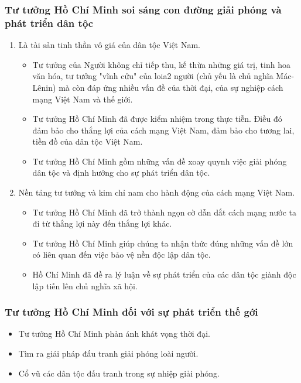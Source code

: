 \documentclass{article}
\begin{document}
	\subsubsection{Tư tưởng Hồ Chí Minh soi sáng con đường giải phóng và phát triển dân tộc}
	\begin{enumerate}
		\item Là tài sản tinh thần vô giá của dân tộc Việt Nam.
		\begin{itemize}
			\item Tư tưởng của Người không chỉ tiếp thu, kế thừa những giá trị, tinh hoa văn hóa, tư tưởng "vĩnh cửu" của loia2 người (chủ yếu là chủ nghĩa Mác-Lênin) mà còn đáp ứng nhiều vấn đề của thời đại, của sự nghiệp cách mạng Việt Nam và thế giới.
			\item Tư tưởng Hồ Chí Minh đã được kiểm nhiệm trong thực tiễn. Điều đó đảm bảo cho thắng lợi của cách mạng Việt Nam, đảm bảo cho tương lai, tiền đồ của dân tộc Việt Nam.
			\item Tư tưởng Hồ Chí Minh gồm những vấn đề xoay quynh việc giải phóng dân tộc và định hướng cho sự phát triển dân tộc.
		\end{itemize}
		\item Nền tảng tư tưởng và kim chỉ nam cho hành động của cách mạng Việt Nam.
		\begin{itemize}
			\item Tư tưởng Hồ Chí Minh đã trở thành ngọn cờ dẫn dắt cách mạng nước ta đi từ thắng lợi này đến thắng lợi khác.
			\item Tư tưởng Hồ Chí Minh giúp chúng ta nhận thức đúng những vấn đề lớn có liên quan đến việc bảo vệ nền độc lập dân tộc.
			\item Hồ Chí Minh đã đề ra lý luận về sự phát triển của các dân tộc giành độc lập tiến lên chủ nghĩa xã hội.
		\end{itemize}
	\end{enumerate}
	\subsubsection{Tư tưởng Hồ Chí Minh đối với sự phát triển thế gới}
	\begin{itemize}
		\item Tư tưởng Hồ Chí Minh phản ánh khát vọng thời đại.
		\item Tìm ra giải pháp đấu tranh giải phóng loài người.
		\item Cổ vũ các dân tộc đấu tranh trong sự nhiệp giải phóng.
	\end{itemize}
\end{document}
